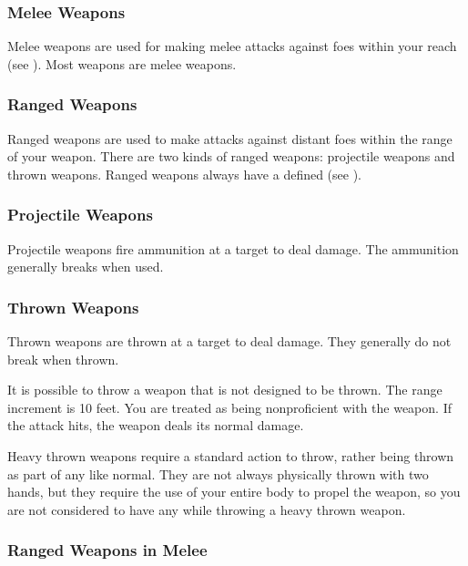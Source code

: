         \subsubsection{Melee Weapons}
            Melee weapons are used for making melee attacks against foes within your reach (see ). Most weapons are melee weapons.

        \subsubsection{Ranged Weapons}
            Ranged weapons are used to make attacks against distant foes within the range of your weapon. There are two kinds of ranged weapons: projectile weapons and thrown weapons.
            Ranged weapons always have a defined  (see ).

            \subsubsection{Projectile Weapons} Projectile weapons fire ammunition at a target to deal damage. The ammunition generally breaks when used.

            \subsubsection{Thrown Weapons}\label{Thrown Weapons} Thrown weapons are thrown at a target to deal damage. They generally do not break when thrown.

                 It is possible to throw a weapon that is not designed to be thrown. The range increment is 10 feet. You are treated as being nonproficient with the weapon. If the attack hits, the weapon deals its normal damage.

                 Heavy thrown weapons require a standard action to throw, rather being thrown as part of any  like normal.
                They are not always physically thrown with two hands, but they require the use of your entire body to propel the weapon, so you are not considered to have any  while throwing a heavy thrown weapon.

            \subsubsection{Ranged Weapons in Melee}

